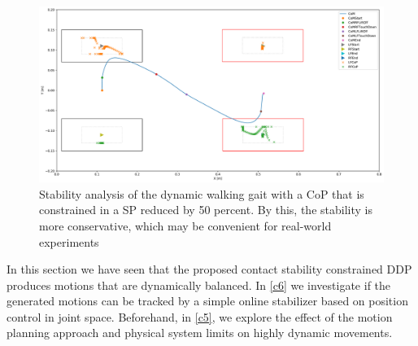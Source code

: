 \begin{figure}[h!]
\centering	
\includegraphics[width=1\textwidth]{fig/walkDynamic/StabilityAnalysis_CoP50}
\caption[Dynamic walking stability analysis with conservative \gls{CoP} restriction]{Stability analysis of the dynamic walking gait with a \gls{CoP} that is constrained in a \gls{SP} reduced by 50 percent. By this, the stability is more conservative, which may be convenient for real-world experiments}
\label{fig:walkDynamic_StabilityCoP50}
\end{figure}

In this section we have seen that the proposed contact stability constrained DDP produces motions that are dynamically balanced. In \cref{c6} we investigate if the generated motions can be tracked by a simple online stabilizer based on position control in joint space. Beforehand, in \cref{c5}, we explore the effect of the motion planning approach and physical system limits on highly dynamic movements.
























